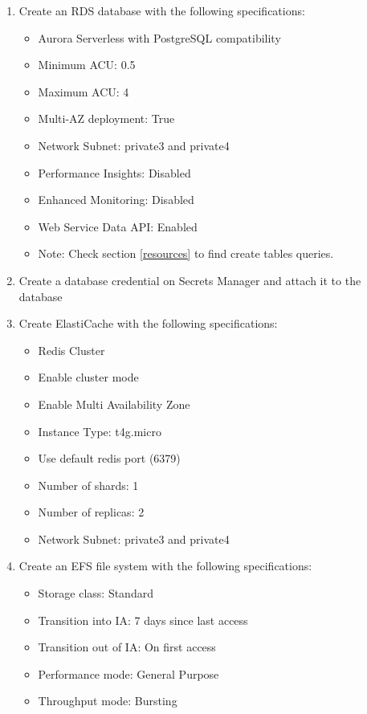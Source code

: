 \documentclass{article}
\begin{document}
\begin{enumerate}
\begin{itemize}
        \end{itemize}
    \item Create an RDS database with the following specifications:
    \begin{itemize}
        \item Aurora Serverless with PostgreSQL compatibility
        \item Minimum ACU: 0.5
        \item Maximum ACU: 4
        \item Multi-AZ deployment: True
        \item Network Subnet: private3 and private4
        \item Performance Insights: Disabled
        \item Enhanced Monitoring: Disabled
        \item Web Service Data API: Enabled
        \item Note: Check section \ref{resources} to find create tables queries.
    \end{itemize}
    \item Create a database credential on Secrets Manager and attach it to the database
    \item Create ElastiCache with the following specifications:
    \begin{itemize}
        \item Redis Cluster
        \item Enable cluster mode
        \item Enable Multi Availability Zone
        \item Instance Type: t4g.micro
        \item Use default redis port (6379)
        \item Number of shards: 1
        \item Number of replicas: 2
        \item Network Subnet: private3 and private4
    \end{itemize}
    \item Create an EFS file system with the following specifications:
    \begin{itemize}
        \item Storage class: Standard
        \item Transition into IA: 7 days since last access
        \item Transition out of IA: On first access
        \item Performance mode: General Purpose
        \item Throughput mode: Bursting

\end{itemize}
\end{enumerate}
\end{document}
